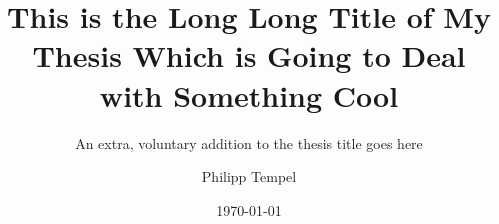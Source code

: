 \documentclass[%
  bachelor,%
  draft,%
  ngerman,%
  main=english,%
  female,%
]{iswstud}
\author{Philipp Tempel}
\date{\today}
\title{This is the Long Long Title of My Thesis Which is Going to Deal with Something Cool}
\subtitle{An extra, voluntary addition to the thesis title goes here}
\begin{document}
\frontmatter


\maketitle



\begin{otherlanguage}{ngerman}
 \maketitle
\end{otherlanguage}



\begin{abstract}
  \Blindtext[3]
  
\end{abstract}



\begin{otherlanguage}{ngerman}
  \begin{abstract}
    \Blindtext[3]

    \draftname
       
  \end{abstract}
\end{otherlanguage}



\end{document}

